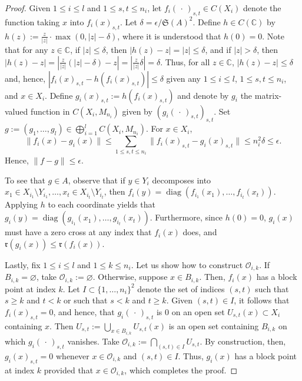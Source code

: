 \documentclass[12pt]{amsart}
\numberwithin{equation}{section}
\theoremstyle{definition}
\theoremstyle{remark}
\newcommand{\diag}{\operatorname{diag}}
\begin{document}
\begin{proof}
	Given $1\leq i\leq  l $ and $1\leq s,t\leq n_{i}$, let $f_{i}(\, \cdot\,)_{s,t}\in C(X_{i})$ denote the function taking $x$ into $f_{i}(x)_{s,t}$. Let $\delta=\epsilon/\mathfrak{S}(A)^{2}$. Define $h\in  C(\mathbb{C})$ by $h(z):=\frac{z}{|z|}\cdot\max(0,|z|-\delta)$, where it is understood that $h(0)=0$. Note that for any $z\in \mathbb{C}$, if $|z|\leq\delta$, then $|h(z)-z|=|z|\leq \delta$, and if $|z|> \delta$, then $|h(z)-z|=\left|\frac{z}{|z|}(|z|-\delta)-z\right|=\left|\frac{z}{|z|}\delta\right|=\delta$. Thus, for all $z\in \mathbb{C}$, $|h(z)-z|\leq\delta$ and, hence, $|f_{i}(x)_{s,t}-h(f_{i}(x)_{s,t})|\leq \delta$ given any $1\leq i\leq l $, $1\leq s,t\leq n_{i}$, and $x\in X_{i}$. Define $g_{i}(x)_{s,t}:=h(f_{i}(x)_{s,t})$ and denote by $g_{i}$ the matrix-valued function in $C(X_{i},M_{n_{i}})$ given by $(g_{i}(\,\cdot\,)_{s,t})_{s,t}$. Set $g:=(g_{1},\ldots,g_{ l })\in\bigoplus_{i=1}^{ l }C(X_{i},M_{n_{i}})$. For $x\in X_{i}$, $$
	\|f_{i}(x)-g_{i}(x)\|\leq\sum_{1\leq s,t\leq n_{i}}\|f_{i}(x)_{s,t}-g_{i}(x)_{s,t}\|\leq n_{i}^{2}\delta\leq \epsilon.
	$$
	Hence, $\|f-g\|\leq\epsilon$.
	
	To see that $g\in A$, observe that if $y\in Y_{i}$ decomposes into $x_{1}\in X_{i_{1}}\setminus Y_{i_{1}},\ldots,x_{t}\in X_{i_{t}}\setminus Y_{i_{t}}$, then $f_{i}(y)=\diag(f_{i_{1}}(x_{1}),\ldots,f_{i_{t}}(x_{t}))$. Applying $h$ to each coordinate yields that
	$g_{i}(y)=\diag(g_{i_{1}}(x_{1}),\ldots,g_{i_{t}}(x_{t}))$. Furthermore, since $h(0)=0$, $g_{i}(x)$ must have a zero cross at any index that $f_{i}(x)$ does, and $\mathfrak{r}(g_{i}(x))\leq \mathfrak{r}(f_{i}(x))$. 
	
	Lastly, fix $1\leq i\leq l $ and $1\leq k\leq n_{i}$. Let us show how to construct $\mathcal{O}_{i,k}$. If $B_{i,k}=\varnothing$, take $\mathcal{O}_{i,k}:=\varnothing$. Otherwise, suppose $x\in B_{i,k}$. Then, $f_{i}(x)$ has a block point at index $k$. Let $I\subset \{1,\ldots,n_{i}\}^{2}$ denote the set of indices $(s,t)$ such that $s\geq k$ and $t<k$ or such that $s<k$ and $t\geq k$. Given $(s,t)\in I$, it follows that $f_{i}(x)_{s,t}=0$, and hence, that $g_{i}( \, \cdot \,)_{s,t}$ is $0$ on an open set $U_{s,t}(x)\subset X_{i}$ containing $x$. Then $U_{s,t}:=\bigcup_{x\in B_{i,k}}U_{s,t}(x)$ is an open set containing $B_{i,k}$ on which $g_{i}( \, \cdot \,)_{s,t}$ vanishes. Take $\mathcal{O}_{i,k}:=\bigcap_{(s,t)\in I}U_{s,t}$. By construction, then, $g_{i}(x)_{s,t}=0$ whenever $x\in \mathcal{O}_{i,k}$ and $(s,t)\in I$. Thus, $g_{i}(x)$  has a block point at index $k$ provided that $x\in \mathcal{O}_{i,k}$, which completes the proof.
\end{proof}
\end{document}
